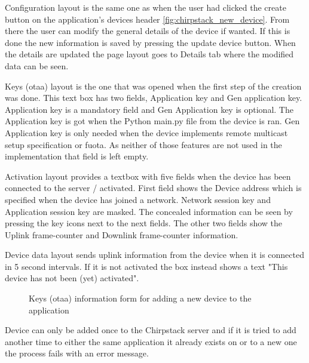 Configuration layout is the same one as when the user had clicked the create button on the application's devices header \ref{fig:chirpstack_new_device}.
From there the user can modify the general details of the device if wanted.
If this is done the new information is saved by pressing the update device button.
When the details are updated the page layout goes to Details tab where the modified data can be seen.

Keys (\gls{otaa}) layout is the one that was opened when the first step of the creation was done.
This text box has two fields, Application key and Gen application key.
Application key is a mandatory field and Gen Application key is optional.
The Application key is got when the Python main.py file from the device is ran.
Gen Application key is only needed when the device implements remote multicast setup specification or \gls{fuota}.
As neither of those features are not used in the implementation that field is left empty.

Activation layout provides a textbox with five fields when the device has been connected to the server / activated.
First field shows the Device address which is specified when the device has joined a network.
Network session key and Application session key are masked.
The concealed information can be seen by pressing the key icons next to the next fields.
The other two fields show the Uplink frame-counter and Downlink frame-counter information.

Device data layout sends uplink information from the device when it is connected in 5 second intervals.
If it is not activated the box instead shows a text "This device has not been (yet) activated".


\begin{figure}[ht]
  \centering
  \caption{Keys (\gls{otaa}) information form for adding a new device to the application}
  \label{fig:chirpstack_new_device_2}
\end{figure}

Device can only be added once to the Chirpstack server and if it is tried to add another time to either the same application it already exists on or to a new one the process fails with an error message.


\clearpage %
